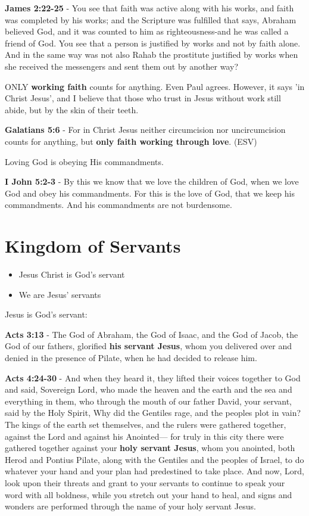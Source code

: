 \documentclass[11pt]{article}
\begin{document}
\textbf{James 2:22-25} - You see that faith was active along with his works, and faith was completed by his works; and the Scripture was fulfilled that says, Abraham believed God, and it was counted to him as righteousness-and he was called a friend of God. You see that a person is justified by works and not by faith alone. And in the same way was not also Rahab the prostitute justified by works when she received the messengers and sent them out by another way?

ONLY \textbf{working faith} counts for anything. Even Paul agrees. However, it says 'in Christ Jesus', and I believe that those who trust in Jesus without work still abide, but by the skin of their teeth.

\textbf{Galatians 5:6} - For in Christ Jesus neither circumcision nor uncircumcision counts for anything, but \textbf{only faith working through love}. (ESV)

Loving God is obeying His commandments.

\textbf{I John 5:2-3} - By this we know that we love the children of God, when we love God and obey his commandments. For this is the love of God, that we keep his commandments. And his commandments are not burdensome.

\section{Kingdom of Servants}
\label{sec:orgaa5945e}
\begin{itemize}
\item Jesus Christ is God's servant
\item We are Jesus' servants
\end{itemize}

Jesus is God's servant:

\textbf{Acts 3:13} - The God of Abraham, the God of Isaac, and the God of Jacob, the God of our fathers, glorified \textbf{his servant Jesus}, whom you delivered over and denied in the presence of Pilate, when he had decided to release him.

\textbf{Acts 4:24-30} - And when they heard it, they lifted their voices together to God and said, Sovereign Lord, who made the heaven and the earth and the sea and everything in them, who through the mouth of our father David, your servant, said by the Holy Spirit, Why did the Gentiles rage, and the peoples plot in vain?  The kings of the earth set themselves, and the rulers were gathered together, against the Lord and against his Anointed— for truly in this city there were gathered together against your \textbf{holy servant Jesus}, whom you anointed, both Herod and Pontius Pilate, along with the Gentiles and the peoples of Israel, to do whatever your hand and your plan had predestined to take place.  And now, Lord, look upon their threats and grant to your servants to continue to speak your word with all boldness, while you stretch out your hand to heal, and signs and wonders are performed through the name of your holy servant Jesus.
\end{document}
